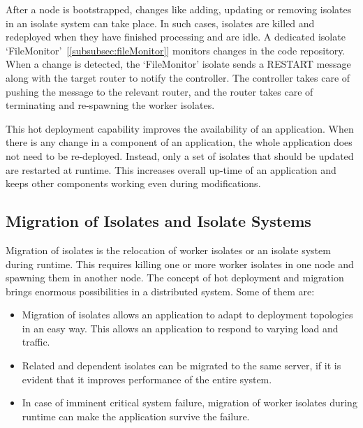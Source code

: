   After a node is bootstrapped, changes like adding, updating or removing isolates in an isolate system can take place. In such cases, isolates are killed and redeployed when they have finished processing and are idle. A dedicated isolate ‘FileMonitor’~[\autoref{subsubsec:fileMonitor}] monitors changes in the code repository. When a change is detected, the ‘FileMonitor’ isolate sends a RESTART message along with the target router to notify the controller. The controller takes care of pushing the message to the relevant router, and the router takes care of terminating and re-spawning the worker isolates.

  This hot deployment capability improves the availability of an application. When there is any change in a component of an application, the whole application does not need to be re-deployed. Instead, only a set of isolates that should be updated are restarted at runtime. This increases overall up-time of an application and keeps other components working even during modifications.

\subsection{Migration of Isolates and Isolate Systems}
  Migration of isolates is the relocation of worker isolates or an isolate system during runtime. This requires killing one or more worker isolates in one node and spawning them in another node. The concept of hot deployment and migration brings enormous possibilities in a distributed system. Some of them are:

\begin{itemize}

  \item Migration of isolates allows an application to adapt to deployment topologies in an easy way. This allows an application to respond to varying load and traffic.

  \item Related and dependent isolates can be migrated to the same server, if it is evident that it improves performance of the entire system.

  \item In case of imminent critical system failure, migration of worker isolates during runtime can make the application survive the failure.

\end{itemize}

